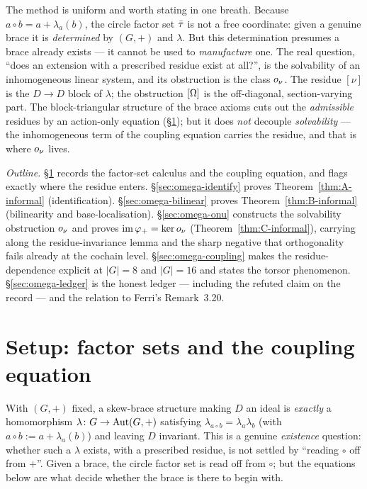 The method is uniform and worth stating in one breath. Because
$a\circ b=a+\lambda_a(b)$, the circle factor set $\bar\tau$ is not a free
coordinate: given a genuine brace it is \emph{determined} by $(G,+)$ and
$\lambda$. But this determination presumes a brace already exists --- it cannot be
used to \emph{manufacture} one. The real question, ``does an extension with a
prescribed residue exist at all?'', is the solvability of an inhomogeneous linear
system, and its obstruction is the class $o_\nu$. The residue $[\nu]$ is the $D\to
D$ block of $\lambda$; the obstruction $[\Omega]$ is the off-diagonal, section-varying
part. The block-triangular structure of the brace axioms cuts out the
\emph{admissible} residues by an action-only equation (\S\ref{sec:omega-setup});
but it does \emph{not} decouple \emph{solvability} --- the inhomogeneous term of
the coupling equation carries the residue, and that is where $o_\nu$ lives.

\medskip\noindent\textit{Outline.}
\S\ref{sec:omega-setup} records the factor-set calculus and the coupling equation,
and flags exactly where the residue enters. \S\ref{sec:omega-identify} proves
Theorem~\ref{thm:A-informal} (identification). \S\ref{sec:omega-bilinear} proves
Theorem~\ref{thm:B-informal} (bilinearity and base-localisation).
\S\ref{sec:omega-onu} constructs the solvability obstruction $o_\nu$ and proves
$\operatorname{im}\varphi_+=\operatorname{ker}o_\nu$ (Theorem~\ref{thm:C-informal}), carrying along the
residue-invariance lemma and the sharp negative that orthogonality fails already
at the cochain level. \S\ref{sec:omega-coupling} makes the residue-dependence
explicit at $|G|=8$ and $|G|=16$ and states the torsor phenomenon.
\S\ref{sec:omega-ledger} is the honest ledger --- including the refuted claim on
the record --- and the relation to Ferri's Remark~3.20.

\section{Setup: factor sets and the coupling equation}\label{sec:omega-setup}

With $(G,+)$ fixed, a skew-brace structure making $D$ an ideal is \emph{exactly} a
homomorphism $\lambda\colon G\to\mathrm{Aut}(G,+)$ satisfying
$\lambda_{a\circ b}=\lambda_a\lambda_b$ (with $a\circ b:=a+\lambda_a(b)$) and
leaving $D$ invariant. This is a genuine \emph{existence} question: whether such a
$\lambda$ exists, with a prescribed residue, is not settled by ``reading $\circ$
off from $+$''. Given a brace, the circle factor set is read off from $\circ$; but
the equations below are what decide whether the brace is there to begin with.

